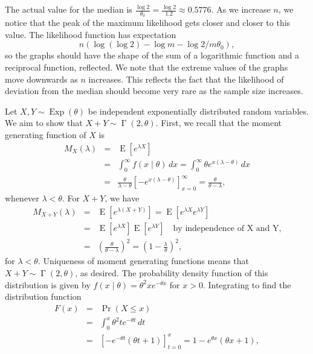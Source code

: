 \documentclass{article}
\newcommand{\pr}{\mathop{\mathrm{Pr}}}
\newcommand{\ex}{\mathop{\mathrm{E}}}
\begin{document}
The actual value for the median is \(\frac{\log 2}{\theta_0} = \frac{\log 2}{1.2} \approx 0.5776\). As we increase \(n\), we notice that the peak of the maximum likelihood gets closer and closer to this value. The likelihood function has expectation 
\[ n(\log(\log 2) - \log m - {\log 2}/{m\theta_0}),\]
so the graphs should have the shape of the sum of a logarithmic function and a reciprocal function, reflected. We note that the extreme values of the graphs move downwards as \(n\) increases. This reflects the fact that the likelihood of deviation from the median should become very rare as the sample size increases.

Let \(X, Y \sim \mathop{\mathrm{Exp}}(\theta)\) be independent exponentially distributed random variables. We aim to show that \(X+Y \sim \mathop{\Gamma}(2, \theta)\). First, we recall that the moment generating function of \(X\) is
\begin{eqnarray*}
    M_X(\lambda) & = & \ex[e^{\lambda X}] \\
                 & = & \int_0^\infty f(x \mid \theta) \,dx = \int_0^\infty \theta e^{x(\lambda - \theta)} \,dx \\
                 & = & \frac{\theta}{\lambda - \theta} [-e^{x(\lambda - \theta)}]_{x=0}^\infty = \frac{\theta}{\theta - \lambda},
\end{eqnarray*} 
whenever \(\lambda < \theta\). For \(X + Y\), we have
\begin{eqnarray*}
    M_{X+Y}(\lambda) & = & \ex[e^{\lambda(X+Y)}] = \ex[e^{\lambda X}e^{\lambda Y}] \\
                     & = & \ex[e^{\lambda X}] \ex[e^{\lambda Y}] \quad \mbox{by independence of X and Y,} \\
                     & = & \left(\frac{\theta}{\theta - \lambda}\right)^2 = \left(1 - \frac{\lambda}{\theta}\right)^2,
\end{eqnarray*}
for \(\lambda < \theta\). Uniqueness of moment generating functions means that \(X+Y \sim \mathop{\Gamma}(2, \theta)\), as desired. The probability density function of this distribution is given by \(f(x \mid \theta) = \theta^2 x e^{-\theta x}\) for \(x > 0\). Integrating to find the distribution function
\begin{eqnarray*}
    F(x) & = & \pr(X \leq x) \\
         & = & \int_0^x \theta^2 t e^{-\theta t}\,dt \\
         & = & [-e^{-\theta t}(\theta t + 1)]_{t=0}^x = 1 - e^{\theta x}(\theta x + 1),
\end{eqnarray*}
\end{document}

